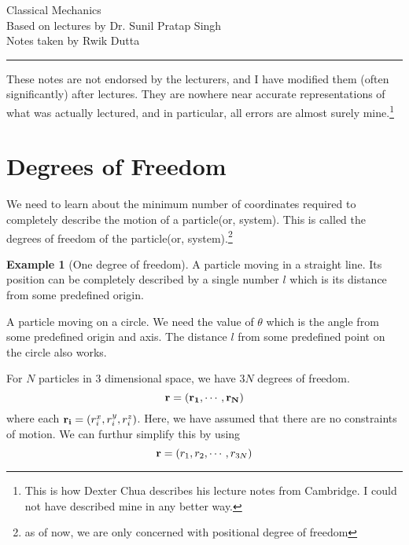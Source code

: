 \documentclass[10pt, a4paper]{extarticle}
\theoremstyle{definition}
\newtheorem{eg}{Example}
\begin{document}
\begin{center}
	\fontsize{25}{60}\selectfont Classical Mechanics \\
	\large Based on lectures by Dr. Sunil Pratap Singh\\
	Notes taken by Rwik Dutta
\end{center}
\hrule
\begin{center}
	These notes are not endorsed by the lecturers, and I have modified them (often
	significantly) after lectures. They are nowhere near accurate representations of what
	was actually lectured, and in particular, all errors are almost surely mine.\footnote[1]{This is how Dexter Chua describes his lecture notes from Cambridge. I could not have described mine in any better way.}
\end{center}
\tableofcontents

\newpage

\section{Degrees of Freedom}
We need to learn about the minimum number of coordinates required to completely describe the motion of a particle(or, system). This is called the degrees of freedom of the particle(or, system).\footnote{as of now, we are only concerned with positional degree of freedom}
\begin{eg}[One degree of freedom]
	A particle moving in a straight line. Its position can be completely described by a single number $l$ which is its distance from some predefined origin.

	A particle moving on a circle. We need the value of $\theta$ which is the angle from some predefined origin and axis. The distance $l$ from some predefined point on the circle also works.
\end{eg}

For $N$ particles in 3 dimensional space, we have $3N$ degrees of freedom.
\[\vb{r}=(\vb{r_1},\cdots,\vb{r_N})\] where each $\vb{r_i}=(r^x_i,r^y_i,r^z_i)$. Here, we have assumed that there are no constraints of motion.
We can furthur simplify this by using \[\vb{r}=(r_1,r_2,\cdots,r_{3N})\]
\end{document}
